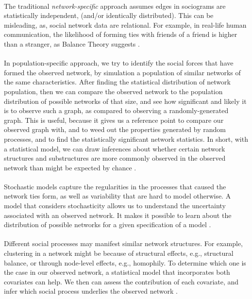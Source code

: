 \documentclass[11pt]{report}
\begin{document}
\paragraph{} The traditional \textit{network-specific} approach assumes edges in sociograms are statistically independent, (and/or identically distributed). This can be misleading, as, social network data are relational. For example, in real-life human communication, the likelihood of forming ties with friends of a friend is higher than a stranger, as Balance Theory suggests \cite{Heider}. \paragraph{} In population-specific approach, we try to identify the social forces that have formed the observed network, by simulation a population of similar networks of the same characteristics. After finding the statistical distribution of network population, then we can compare the observed network to the population distribution of possible networks of that size, and see how significant and likely it is to observe such a graph, as compared to observing a randomly-generated graph. This is useful, because it gives us a reference point to compare our observed graph with, and to weed out the properties generated by random processes, and to find the statistically significant network statistics. In short, with a statistical model, we can draw inferences about whether certain network structures and substructures are more commonly observed in the observed network than might be expected by chance \cite{Robins}. \paragraph{} Stochastic models capture the regularities in the processes that caused the network ties form, as well as variability that are hard to model otherwise. A model that considers stochasticity allows us to understand the uncertainty associated with an observed network. It makes it possible to learn about the distribution of possible networks for a given specification of a model \cite{Robins}. \paragraph{} Different social processes may manifest similar network structures. For example, clustering in a network might be because of structural effects, e.g., structural balance, or through node-level effects, e.g., homophily. To determine which one is the case in our observed network, a statistical model that incorporates both covariates can help. We then can assess the contribution of each covariate, and infer which social process underlies the observed network \cite{Robins}. 
\end{document}
